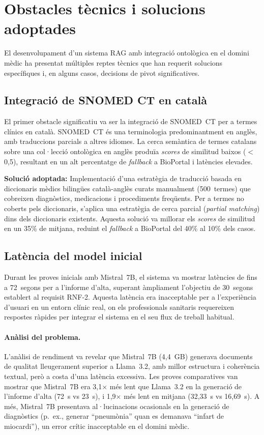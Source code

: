 \documentclass[CAT]{TFUOC}%
\begin{document}
\section{Obstacles tècnics i solucions adoptades}

El desenvolupament d'un sistema RAG amb integració ontològica en el domini mèdic ha presentat múltiples reptes tècnics que han requerit solucions específiques i, en alguns casos, decisions de pivot significatives.

\subsection{Integració de SNOMED CT en català}

El primer obstacle significatiu va ser la integració de SNOMED~CT per a termes clínics en català. SNOMED~CT és una terminologia predominantment en anglès, amb traduccions parcials a altres idiomes. La cerca semàntica de termes catalans sobre una col·lecció ontològica en anglès produïa \textit{scores} de similitud baixos ($<$0,5), resultant en un alt percentatge de \textit{fallback} a BioPortal i latències elevades.

\textbf{Solució adoptada:} Implementació d'una estratègia de traducció basada en diccionaris mèdics bilingües català-anglès curats manualment (500~termes) que cobreixen diagnòstics, medicacions i procediments freqüents. Per a termes no coberts pels diccionaris, s'aplica una estratègia de cerca parcial (\textit{partial matching}) dins dels diccionaris existents. Aquesta solució va millorar els \textit{scores} de similitud en un 35\% de mitjana, reduint el \textit{fallback} a BioPortal del 40\% al 10\% dels casos.

\subsection{Latència del model inicial}

Durant les proves inicials amb Mistral~7B, el sistema va mostrar latències de fins a 72~segons per a l'informe d'alta, superant àmpliament l'objectiu de 30~segons establert al requisit RNF-2. Aquesta latència era inacceptable per a l'experiència d'usuari en un entorn clínic real, on els professionals sanitaris requereixen respostes ràpides per integrar el sistema en el seu flux de treball habitual.

\paragraph{Anàlisi del problema.}
L'anàlisi de rendiment va revelar que Mistral~7B (4,4~GB) generava documents de qualitat lleugerament superior a Llama~3.2, amb millor estructura i coherència textual, però a costa d'una latència excessiva. Les proves comparatives van mostrar que Mistral~7B era 3,1$\times$ més lent que Llama~3.2 en la generació de l'informe d'alta (72~s vs 23~s), i 1,9$\times$ més lent en mitjana (32,33~s vs 16,69~s). A més, Mistral~7B presentava al·lucinacions ocasionals en la generació de diagnòstics (p.~ex., generar ``pneumònia'' quan es demanava ``infart de miocardi''), un error crític inacceptable en el domini mèdic.
\end{document}
